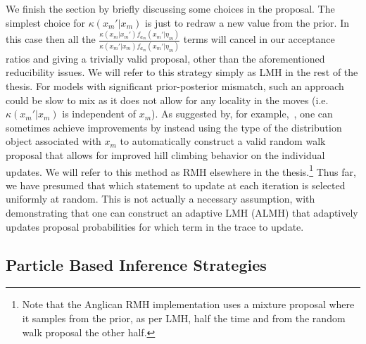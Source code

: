 We finish the section by briefly discussing some choices in the proposal.  The simplest choice for
$\kappa(x_m'|x_m)$ is just to redraw a new value from the prior.  In this case then all the 
$\frac{\kappa(x_m | x_{m}') f_{a_m} (x_m' | \eta_m)} {\kappa(x_m' | x_{m}) f_{a_m} (x_m' | \eta_m)}$ terms
will cancel in our acceptance ratios and giving a trivially valid proposal, other than the aforementioned 
reducibility issues.  We will refer to this strategy simply
as LMH in the rest of the thesis.  For models with significant prior-posterior mismatch, such an approach could be
slow to mix as it does not allow for any locality in the moves (i.e. $\kappa(x_m'|x_m)$ is independent of $x_m$).
As suggested by, for example,~\cite{le2015rmh}, one can sometimes achieve improvements by instead using the type of the 
distribution object associated with $x_m$ to automatically construct a valid random walk proposal that allows for 
improved hill climbing
behavior on the individual updates.  We will refer to this method as RMH elsewhere in the thesis.\footnote{Note that
	the Anglican RMH implementation uses a mixture proposal where it samples from the prior, as per LMH, half the time
	and from the random walk proposal the other half.}  Thus far, we have
presumed that which \sample statement to update at each iteration is selected uniformly at random.  This is not
actually a necessary assumption, with~\cite{tolpin2015output} demonstrating that one can construct an adaptive LMH (ALMH)
that adaptively updates proposal probabilities for which term in the trace to update.

\subsection{Particle Based Inference Strategies}
\label{sec:proginf:str:part}

